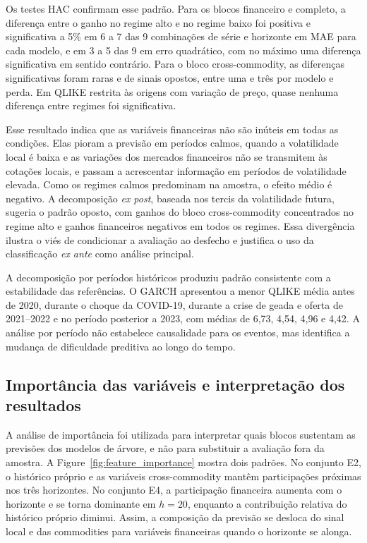 \documentclass[a4paper,fleqn]{cas-sc}
\begin{document}
Os testes HAC confirmam esse padrão. Para os blocos financeiro e completo, a diferença entre o ganho no regime alto e no regime baixo foi positiva e significativa a 5\% em 6 a 7 das 9 combinações de série e horizonte em MAE para cada modelo, e em 3 a 5 das 9 em erro quadrático, com no máximo uma diferença significativa em sentido contrário. Para o bloco cross-commodity, as diferenças significativas foram raras e de sinais opostos, entre uma e três por modelo e perda. Em QLIKE restrita às origens com variação de preço, quase nenhuma diferença entre regimes foi significativa.

Esse resultado indica que as variáveis financeiras não são inúteis em todas as condições. Elas pioram a previsão em períodos calmos, quando a volatilidade local é baixa e as variações dos mercados financeiros não se transmitem às cotações locais, e passam a acrescentar informação em períodos de volatilidade elevada. Como os regimes calmos predominam na amostra, o efeito médio é negativo. A decomposição \textit{ex post}, baseada nos tercis da volatilidade futura, sugeria o padrão oposto, com ganhos do bloco cross-commodity concentrados no regime alto e ganhos financeiros negativos em todos os regimes. Essa divergência ilustra o viés de condicionar a avaliação ao desfecho e justifica o uso da classificação \textit{ex ante} como análise principal.

A decomposição por períodos históricos produziu padrão consistente com a estabilidade das referências. O GARCH apresentou a menor QLIKE média antes de 2020, durante o choque da COVID-19, durante a crise de geada e oferta de 2021--2022 e no período posterior a 2023, com médias de 6,73, 4,54, 4,96 e 4,42. A análise por período não estabelece causalidade para os eventos, mas identifica a mudança de dificuldade preditiva ao longo do tempo.

\subsection{Importância das variáveis e interpretação dos resultados}
\label{subsec:results_explainability}

A análise de importância foi utilizada para interpretar quais blocos sustentam as previsões dos modelos de árvore, e não para substituir a avaliação fora da amostra. A Figure~\ref{fig:feature_importance} mostra dois padrões. No conjunto E2, o histórico próprio e as variáveis cross-commodity mantêm participações próximas nos três horizontes. No conjunto E4, a participação financeira aumenta com o horizonte e se torna dominante em \(h=20\), enquanto a contribuição relativa do histórico próprio diminui. Assim, a composição da previsão se desloca do sinal local e das commodities para variáveis financeiras quando o horizonte se alonga.
\end{document}
